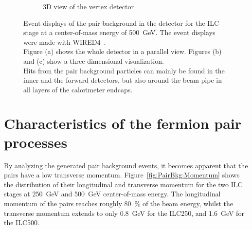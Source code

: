 \begin{figure}[h]
\begin{subfigure}[b]{0.49\textwidth}
   \caption{3D view of the vertex detector}
   \end{subfigure}
   \caption[Pair background event displays]{Event displays of the pair background in the 
   \sid detector for the ILC stage at a center-of-mass energy of \SI[detect-all]{500}{\GeV}. 
   The event displays were made with WIRED4~\cite{Wired4}.
   \\Figure (a) shows the whole \sid detector in a parallel view.
   Figures (b) and (c) show a three-dimensional visualization.
   \\Hits from the pair background particles can mainly be found in the inner and the forward detectors, but also around the beam pipe in all layers of the calorimeter endcaps.
   }
   \label{fig:PairBkg:wired4}
 \end{figure}

\section{Characteristics of the fermion pair processes}
\label{PairBkg:helix}
By analyzing the generated pair background events, it becomes apparent that the \positron\electron pairs have a low transverse momentum.
Figure~\ref{fig:PairBkg:Momentum} shows the distribution of their longitudinal and transverse momentum for the two ILC stages at \SI{250}{\GeV} and \SI{500}{\GeV} center-of-mass energy.
The longitudinal momentum of the \positron\electron pairs reaches roughly \SI{80}{\percent} of the beam energy, whilst the transverse momentum extends to only \SI{0.8}{\GeV} for the ILC250, and \SI{1.6}{\GeV} for the ILC500.
